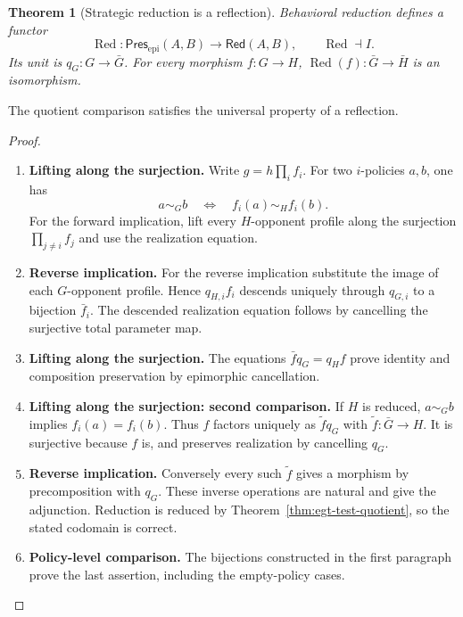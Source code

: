 \documentclass[11pt,a4paper]{article}
\numberwithin{equation}{section}
\newtheorem{theorem}{Theorem}[section]
\theoremstyle{definition}
\theoremstyle{remark}
\theoremstyle{plain}
\begin{document}
\begin{theorem}[Strategic reduction is a reflection]
\label{thm:egt-reduction-reflection}
Behavioral reduction defines a functor
\[
 \operatorname{Red}:\mathsf{Pres}_{\mathrm{epi}}(A,B)
 \longrightarrow\mathsf{Red}(A,B),\qquad
 \operatorname{Red}\dashv I.
\]
Its unit is $q_G:G\to\bar G$. For every morphism $f:G\to H$,
$\operatorname{Red}(f):\bar G\to\bar H$ is an isomorphism.
\end{theorem}

\noindent The quotient comparison satisfies the universal property of a reflection.
\begin{center}
\end{center}


\begin{proof}
\leavevmode
\begin{enumerate}[label=\textup{(\arabic*)},leftmargin=*,itemsep=4pt,topsep=3pt]
  \item \textbf{Lifting along the surjection.} Write $g=h\prod_i f_i$. For two $i$-policies $a,b$, one has
\[
 a\sim_G b\quad\Longleftrightarrow\quad f_i(a)\sim_H f_i(b).
\]
For the forward implication, lift every $H$-opponent profile along the
surjection $\prod_{j\ne i}f_j$ and use the realization equation.
  \item \textbf{Reverse implication.} For the reverse implication substitute the image of each $G$-opponent
profile. Hence $q_{H,i}f_i$ descends uniquely through $q_{G,i}$ to a
bijection $\bar f_i$. The descended realization equation follows by
cancelling the surjective total parameter map.
  \item \textbf{Lifting along the surjection.} The equations
$\bar f q_G=q_Hf$ prove identity and composition preservation by
epimorphic cancellation.
  \item \textbf{Lifting along the surjection: second comparison.} If $H$ is reduced, $a\sim_G b$ implies $f_i(a)=f_i(b)$. Thus $f$ factors uniquely as $\widetilde f q_G$ with
$\widetilde f:\bar G\to H$. It is surjective because $f$ is, and
preserves realization by cancelling $q_G$.
  \item \textbf{Reverse implication.} Conversely every such
$\widetilde f$ gives a morphism by precomposition with $q_G$. These inverse operations are natural and give the adjunction. Reduction
is reduced by Theorem~\ref{thm:egt-test-quotient}, so the stated codomain
is correct.
  \item \textbf{Policy-level comparison.} The bijections constructed in the first paragraph prove the
last assertion, including the empty-policy cases.
\end{enumerate}
\end{proof}
\end{document}
